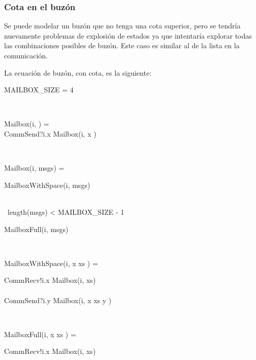 \subsubsection*{Cota en el buzón}

Se puede modelar un buzón que no tenga una cota superior, pero se tendría nuevamente problemas de explosión de estados ya que \FDR intentaría explorar todas las combinaciones posibles de buzón. Este caso es similar al de la lista en la comunicación. 

La ecuación de buzón, con cota, es la siguiente:

\begin{process}

\begin{block}
MAILBOX\_SIZE = 4
\end{block} \\

\begin{block}
Mailbox(i, \nil) = {} \\ \quad
CommSend?i.x \then Mailbox(i, \lseq x \rseq) 
\end{block} \\

\begin{block}
Mailbox(i, msgs) = {} \\ \quad
  \begin{block} \quad

    \begin{block} 
      MailboxWithSpace(i, msgs)
    \end{block} \\
       {} \lceil\ length(msgs) < MAILBOX\_SIZE - 1\ \rceil  \\ \quad

    \begin{block}
      MailboxFull(i, msgs)
    \end{block}

  \end{block} 
\end{block} \\

\begin{block}
MailboxWithSpace(i, \lseq x \rseq \cat xs ) = {} \\ \quad 
  \begin{block}
    CommRecv!i.x \then Mailbox(i, xs) \\
    \Extchoice \\
    CommSend?i.y \then Mailbox(i, \lseq x \rseq \cat xs \cat \lseq y \rseq ) 
  \end{block}
\end{block} \\

\begin{block}
MailboxFull(i, \lseq x \rseq \cat xs ) = {} \\ \quad 
  \begin{block}
    CommRecv!i.x \then Mailbox(i, xs) \\
  \end{block}
\end{block} \\
\end{process}

